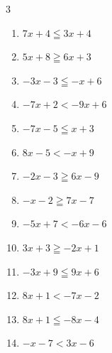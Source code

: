 \begin{multicols}{3}
\begin{enumerate}
  \item $7x+4\leqq 3x+4$

        \phantom{$\displaystyle x\leqq 0$}

  \item $5x+8\geqq 6x+3$

        \phantom{$\displaystyle x\leqq 5$}

  \item $-3x-3\leqq -x+6$


  \item $-7x+2<-9x+6$

        \phantom{$\displaystyle x<2$}

  \item $-7x-5\leqq x+3$

        \phantom{$\displaystyle x\geqq -1$}

\columnbreak %

  \item $8x-5<-x+9$


  \item $-2x-3\geqq 6x-9$


  \item $-x-2\geqq 7x-7$


  \item $-5x+7<-6x-6$

        \phantom{$\displaystyle x<-13$}

  \item $3x+3\geqq -2x+1$


  \item $-3x+9\leqq 9x+6$


  \item $8x+1<-7x-2$


  \item $8x+1\leqq -8x-4$


  \item $-x-7<3x-6$


\end{enumerate}
\end{multicols}

